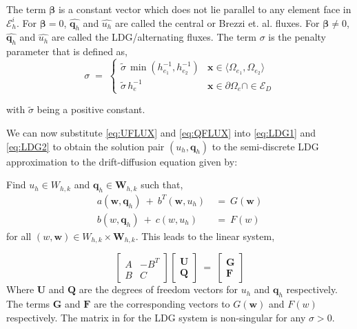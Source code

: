 \documentclass[10pt]{report}
\numberwithin{equation}{section}
\begin{document}
\noindent
The term $\boldsymbol \beta$ is a constant vector which does not lie parallel to any element face in $ \mathcal{E}_{h}^{i}$.  For $\boldsymbol \beta =  0$,  $\widehat{\textbf{q}_{h}}$ and $\widehat{u_{h}}$ are called the central or Brezzi et. al. fluxes. For  $\boldsymbol \beta \neq  0$, $\widehat{\textbf{q}_{h}}$ and $\widehat{u_{h}}$ are called the LDG/alternating fluxes.  The term $\sigma$ is the penalty parameter that is defined as,
\begin{equation}
\sigma \; = \; \left\{ 
\begin{array}{cc}
\tilde{\sigma} \, \min \left( h^{-1}_{e_{1}}, h^{-1}_{e_{2}} \right) & \textbf{x} \in \langle \Omega_{e_{1}}, \Omega_{e_{2}} \rangle \\
\tilde{\sigma}  \, h^{-1}_{e} & \textbf{x} \in \partial \Omega_{e} \cap \in \mathcal{E}_{D}
\end{array}
\right. 
\label{eq:Penalty}
\end{equation}

\noindent
with $\tilde{\sigma}$ being a positive constant.

\vspace{2mm}

We can now substitute \eqref{eq:UFLUX} and \eqref{eq:QFLUX} into \eqref{eq:LDG1} and \eqref{eq:LDG2} to obtain the solution pair $(u_{h}, \textbf{q}_{h})$ to the semi-discrete LDG approximation to the drift-diffusion equation given by:

\vspace{2mm}

 
Find $u_{h} \in W_{h,k}$ and $\textbf{q}_{h} \in  \textbf{W}_{h,k}$ such that,
\begin{align}
a(\textbf{w}, \textbf{q}_{h})  \ +  \ b^{T}(\textbf{w}, u_{h}) \ &= \ G(\textbf{w}) \nonumber \\
b(w, \textbf{q}_{h}) \ + \   c(w, u_{h})  \ &= \ F(w)
\label{eq:LDG_bilinear}
\end{align}
\noindent
for all $(w, \textbf{w}) \in W_{h,k} \times \textbf{W}_{h,k}$.  This leads to the linear system,

\begin{equation}
\left[ 
\begin{matrix}
A  & -B^{T}  \\
B & C 
\end{matrix}
\right]
\left[
\begin{matrix}
\textbf{U}\\
\textbf{Q}
\end{matrix}
\right]
\ = \
\left[
\begin{matrix}
\textbf{G}\\
\textbf{F}
\end{matrix}
\right]
\end{equation}
Where $\textbf{U}$ and $\textbf{Q}$ are the degrees of freedom vectors for $u_{h}$ and $\textbf{q}_{h}$ respectively. The terms $\textbf{G}$ and $\textbf{F}$ are the corresponding vectors to $G(\textbf{w})$ and $F(w)$ respectively. The matrix in for the LDG system is non-singular for any $\sigma > 0$.
\end{document}
